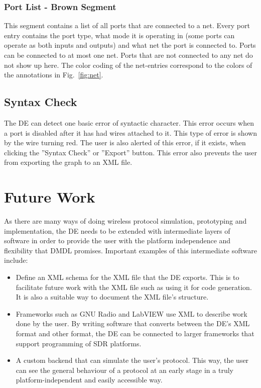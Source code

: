 \documentclass[journal,comsoc]{IEEEtran}
\begin{document}
\subsubsection{Port List - Brown Segment}
This segment contains a list of all ports that are connected to a net. Every port entry contains
the port type, what mode it is operating in (some ports can operate as both inputs and outputs)
and what net the port is connected to. Ports can be connected to at most one net. Ports that
are not connected to any net do not show up here. The color coding of the net-entries correspond
to the colors of the annotations in Fig.~\ref{fig:net}.

\subsection{Syntax Check}
The DE can detect one basic error of syntactic character. This error occurs when a port is
disabled after it has had wires attached to it. This type of error is shown by the wire turning
red. The user is also alerted of this error, if it exists, when clicking the ''Syntax Check''
or ''Export'' button. This error also prevents the user from exporting the graph to an XML file.

\section{Future Work}
As there are many ways of doing wireless protocol simulation, prototyping and implementation, the
DE needs to be extended with intermediate layers of software in order to provide the user with
the platform independence and flexibility that DMDL promises. Important examples of this
intermediate software include:
\begin{itemize}
    \item Define an XML schema for the XML file that the DE exports. This is to facilitate
          future work with the XML file such as using it for code generation. It is also a
          suitable way to document the XML file's structure.
    \item Frameworks such as GNU Radio and LabVIEW use XML to describe work done by the user.
          By writing software that converts between the DE's XML format and other format, the
          DE can be connected to larger frameworks that support programming of SDR platforms.
    \item A custom backend that can simulate the user's protocol. This way, the user can
          see the general behaviour of a protocol at an early stage in a truly
          platform-independent and easily accessible way.
\end{itemize}
\end{document}
